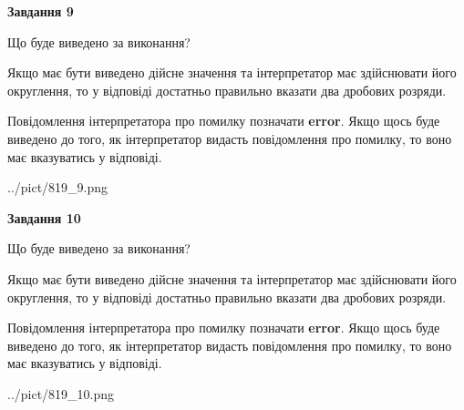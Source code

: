 \documentclass[12pt, ukrainian]{article}
\begin{document}
{\begin {Large}
{\begin {center}\textbf{Завдання 9}\end {center}}\par
Що буде виведено за виконання? \par

Якщо має бути виведено дійсне значення та інтерпретатор має здійснювати його округлення, 
то у відповіді достатньо правильно вказати два дробових розряди.

Повідомлення інтерпретатора про помилку позначати \textbf{error}.
Якщо щось буде виведено до того, як інтерпретатор видасть повідомлення про помилку, 
то воно має вказуватись у відповіді. \par

\begin{center}
	{../pict/819_9.png}
\end{center}
\newpage

{\begin {center}\textbf{Завдання 10}\end {center}}\par
Що буде виведено за виконання? \par

Якщо має бути виведено дійсне значення та інтерпретатор має здійснювати його округлення, 
то у відповіді достатньо правильно вказати два дробових розряди.

Повідомлення інтерпретатора про помилку позначати \textbf{error}.
Якщо щось буде виведено до того, як інтерпретатор видасть повідомлення про помилку, 
то воно має вказуватись у відповіді. \par

\begin{center}
	{../pict/819_10.png}
\end{center}
\newpage

\end {Large}}
\end{document}
